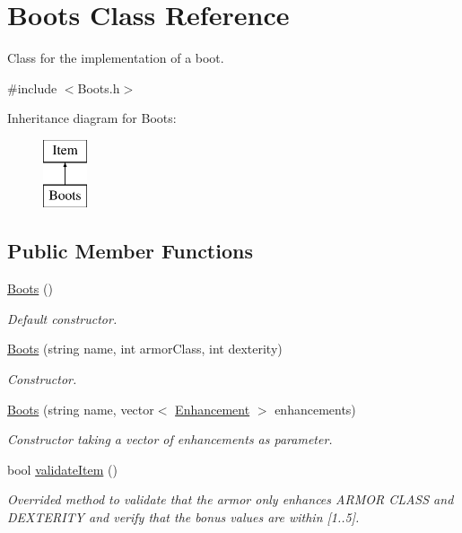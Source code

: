 \hypertarget{class_boots}{}\section{Boots Class Reference}
\label{class_boots}


Class for the implementation of a boot.  




{\ttfamily \#include $<$Boots.\+h$>$}

Inheritance diagram for Boots\+:\begin{figure}[H]
\begin{center}
\leavevmode
\includegraphics[height=2.000000cm]{class_boots}
\end{center}
\end{figure}
\subsection*{Public Member Functions}
\begin{DoxyCompactItemize}
\item 
\hypertarget{class_boots_abad208e963b53b1f29e269fc246a3485}{}\label{class_boots_abad208e963b53b1f29e269fc246a3485} 
\hyperlink{class_boots_abad208e963b53b1f29e269fc246a3485}{Boots} ()
\begin{DoxyCompactList}\small\item\em Default constructor. \end{DoxyCompactList}\item 
\hyperlink{class_boots_ab5fc35f0d1d71561bad9b81997cefc0f}{Boots} (string name, int armor\+Class, int dexterity)
\begin{DoxyCompactList}\small\item\em Constructor. \end{DoxyCompactList}\item 
\hyperlink{class_boots_a1cf3ea6e4ad15701b13f9010348a68d9}{Boots} (string name, vector$<$ \hyperlink{class_enhancement}{Enhancement} $>$ enhancements)
\begin{DoxyCompactList}\small\item\em Constructor taking a vector of enhancements as parameter. \end{DoxyCompactList}\item 
bool \hyperlink{class_boots_aac6123a5f117993f276eb5f2f343eeb0}{validate\+Item} ()
\begin{DoxyCompactList}\small\item\em Overrided method to validate that the armor only enhances \textquotesingle{}A\+R\+M\+OR C\+L\+A\+SS\textquotesingle{} and \textquotesingle{}D\+E\+X\+T\+E\+R\+I\+TY\textquotesingle{} and verify that the bonus values are within \mbox{[}1..5\mbox{]}. \end{DoxyCompactList}\end{DoxyCompactItemize}
